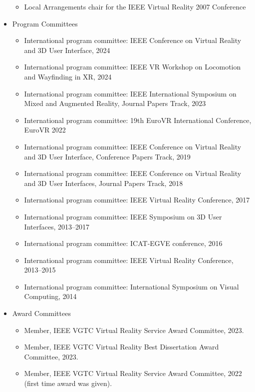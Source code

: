 \documentclass[wideaddress]{vitae}
\let\olditem\item
\def\item{\nopagebreak[4]\olditem}%
\begin{document}
\begin{itemize}
\begin{itemize}
			\item{Local Arrangements chair for the IEEE Virtual Reality 2007 Conference}
		\end{itemize}
	\item{Program Committees}
		\begin{itemize}
			\item{International program committee: IEEE Conference on Virtual Reality and 3D User Interface, 2024}
                \item{International program committee: IEEE VR Workshop on Locomotion and Wayfinding in XR, 2024}
                \item{International program committee: IEEE International Symposium on Mixed and Augmented Reality, Journal Papers Track, 2023}
			\item{International program committee: 19th EuroVR International Conference, EuroVR 2022}
			\item{International program committee: IEEE Conference on Virtual Reality and 3D User Interface, Conference Papers Track, 2019}
			\item{International program committee: IEEE Conference on Virtual Reality and 3D User Interfaces, Journal Papers Track, 2018}
			\item{International program committee: IEEE Virtual Reality Conference, 2017}
			\item{International program committee: IEEE Symposium on 3D User Interfaces, 2013--2017}
			\item{International program committee: ICAT-EGVE conference, 2016}
			\item{International program committee: IEEE Virtual Reality Conference, 2013--2015}
			\item{International program committee: International Symposium on Visual Computing, 2014}
		\end{itemize}
    \item Award Committees
        \begin{itemize}
            \item Member, IEEE VGTC Virtual Reality Service Award Committee, 2023.
            \item Member, IEEE VGTC Virtual Reality Best Dissertation Award Committee, 2023.
            \item Member, IEEE VGTC Virtual Reality Service Award Committee, 2022 (first time award was given).
        \end{itemize}
            

\end{itemize}
\end{document}
